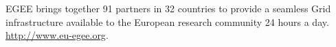 \documentclass{elsart}
\begin{document}
\begin{thebibliography}{00}
  EGEE brings together 91 partners in 32 countries to provide a seamless Grid
  infrastructure available to the European research community 24 hours a day.
  \url{http://www.eu-egee.org}.





\end{thebibliography}
\end{document}
